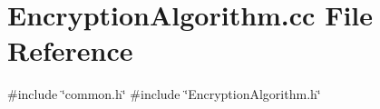 \section{Encryption\+Algorithm.\+cc File Reference}
\label{EncryptionAlgorithm_8cc}
{\ttfamily \#include \char`\"{}common.\+h\char`\"{}}\newline
{\ttfamily \#include \char`\"{}Encryption\+Algorithm.\+h\char`\"{}}\newline
